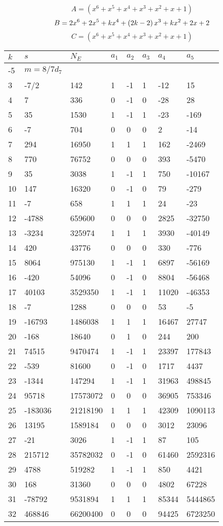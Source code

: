 \documentclass{amsart}
\begin{document}
$$A=(x^6
 + x^5
 + x^4
 + x^3
 + x^2
 + x
 + 1)$$
$$B=2\*x^6
 + 2\*x^5
 + k\*x^4
 + \left(2\*k
 - 2\right) \*x^3
 + k\*x^2
 + 2\*x
 + 2$$
$$C=(x^6
 + x^5
 + x^4
 + x^3
 + x^2
 + x
 + 1)$$
\begin{longtable}{|l|l|l|lllll|}
\hline
$k$ & $s$ & $N_E$ & $a_1$ & $a_2$ & $a_3$ & $a_4$ & $a_5$\\
\hline
-5&$m=8/7d_{7}$&&\multicolumn{5}{c|}{}\\
3&-7/2&142&1&-1&1&-12&15\\
4&7&336&0&-1&0&-28&28\\
5&35&1530&1&-1&1&-23&-169\\
6&-7&704&0&0&0&2&-14\\
7&294&16950&1&1&1&162&-2469\\
8&770&76752&0&0&0&393&-5470\\
9&35&3038&1&-1&1&750&-10167\\
10&147&16320&0&-1&0&79&-279\\
11&-7&658&1&1&1&24&-23\\
12&-4788&659600&0&0&0&2825&-32750\\
13&-3234&325974&1&1&1&3930&-40149\\
14&420&43776&0&0&0&330&-776\\
15&8064&975130&1&-1&1&6897&-56169\\
16&-420&54096&0&-1&0&8804&-56468\\
17&40103&3529350&1&-1&1&11020&-46353\\
18&-7&1288&0&0&0&53&-5\\
19&-16793&1486038&1&1&1&16467&27747\\
20&-168&18640&0&1&0&244&200\\
21&74515&9470474&1&-1&1&23397&177843\\
22&-539&81600&0&-1&0&1717&4437\\
23&-1344&147294&1&-1&1&31963&498845\\
24&95718&17573072&0&0&0&36905&753346\\
25&-183036&21218190&1&1&1&42309&1090113\\
26&13195&1589184&0&0&0&3012&23096\\
27&-21&3026&1&-1&1&87&105\\
28&215712&35782032&0&-1&0&61460&2592316\\
29&4788&519282&1&-1&1&850&4421\\
30&168&31360&0&0&0&4802&67228\\
31&-78792&9531894&1&1&1&85344&5444865\\
32&468846&66200400&0&0&0&94425&6723250\\

\end{longtable}
\end{document}
